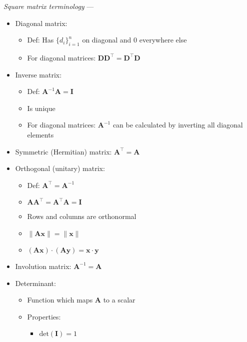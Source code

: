 \emph{Square matrix terminology} ---
\begin{itemize}
    \item Diagonal matrix:
    \begin{itemize}
        \item Def: Has $\{d_i\}_{i=1}^n$ on diagonal and 0 everywhere else
        \item For diagonal matrices: $\boldsymbol{D}\boldsymbol{D}^\intercal = \boldsymbol{D}^\intercal\boldsymbol{D}$
    \end{itemize} 
    \item Inverse matrix:
    \begin{itemize}
        \item Def: $\boldsymbol{A}^{-1}\boldsymbol{A} = \boldsymbol{I}$
        \item Is unique
        \item For diagonal matrices: $\boldsymbol{A}^{-1}$ can be calculated by inverting all diagonal elements  
    \end{itemize} 
    \item Symmetric (Hermitian) matrix: $\boldsymbol{A}^\intercal = \boldsymbol{A}$
    \item Orthogonal (unitary) matrix: 
    \begin{itemize}
        \item Def: $\boldsymbol{A}^\intercal = \boldsymbol{A}^{-1}$
        \item $\boldsymbol{A}\boldsymbol{A}^\intercal = \boldsymbol{A}^\intercal\boldsymbol{A} = \boldsymbol{I}$
        \item Rows and columns are orthonormal
        \item $\|\boldsymbol{A} \boldsymbol{x}\| = \|\boldsymbol{x}\|$
        \item $(\boldsymbol{A}\boldsymbol{x}) \cdot (\boldsymbol{A}\boldsymbol{y}) = \boldsymbol{x} \cdot \boldsymbol{y}$
    \end{itemize}
    \item Involution matrix: $\boldsymbol{A}^{-1} = \boldsymbol{A}$
    \item Determinant: 
    \begin{itemize}
        \item Function which maps $\boldsymbol{A}$ to a scalar
        \item Properties:
        \begin{multicols}{2}
        \begin{itemize}
            \item $\textrm{det}(\boldsymbol{I}) = 1$

\end{itemize}
\end{multicols}
\end{itemize}
\end{itemize}
